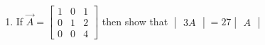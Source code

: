 \renewcommand{\theequation}{\theenumi}
\begin{enumerate}[label=\arabic*.,ref=\thesubsection.\theenumi]

\item If $\vec A = \begin{bmatrix}
1 & 0 & 1 
\\
0 & 1 & 2
\\
0 & 0 & 4
\end{bmatrix}$
then show that $\begin{vmatrix}3A\end{vmatrix} = 27\begin{vmatrix}A\end{vmatrix}$
\end{enumerate}